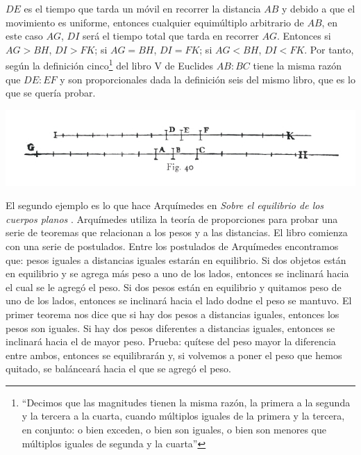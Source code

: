 $DE$ es el tiempo que tarda un móvil en recorrer la distancia $AB$ y debido a que el movimiento es uniforme, entonces cualquier equimúltiplo arbitrario de $AB$, en este caso $AG$, $DI$ será el tiempo total que tarda en recorrer $AG$. Entonces si $AG > BH$, $DI > FK$; si $AG = BH$, $DI = FK$; si $AG < BH$, $DI < FK$. Por tanto, según la definición cinco\footnote{``Decimos que las magnitudes tienen la misma razón, la primera a la segunda y  la tercera a la cuarta, cuando múltiplos iguales de la primera y la tercera, en conjunto: o bien exceden, o bien son iguales, o bien son menores que múltiplos iguales de segunda y la cuarta''} del libro V de Euclides \cite{Euclides1956} $AB:BC$ tiene la misma razón que $DE:EF$ y son proporcionales dada la definición seis del mismo libro, que es lo que se quería probar.

\includegraphics[width=\textwidth]{fig40.jpg}

El segundo ejemplo es lo que hace Arquímedes en \emph{Sobre el equilibrio de los cuerpos planos} \cite{Archimedes1897}. Arquímedes utiliza la teoría de proporciones para probar una serie de teoremas que relacionan a los pesos y a las distancias. El libro comienza con una serie de postulados. Entre los postulados de Arquímedes encontramos que: pesos iguales a distancias iguales estarán en equilibrio. Si dos objetos están en equilibrio y se agrega más peso a uno de los lados, entonces se inclinará hacia el cual se le agregó el peso. Si dos pesos están en equilibrio y quitamos peso de uno de los lados, entonces se inclinará hacia el lado dodne el peso se mantuvo. El primer teorema nos dice que si hay dos pesos a distancias iguales, entonces los pesos son iguales. Si hay dos pesos diferentes a distancias iguales, entonces se inclinará hacia el de mayor peso. Prueba: quítese del peso mayor la diferencia entre ambos, entonces se equilibrarán y, si volvemos a poner el peso que hemos quitado, se balánceará hacia el que se agregó el peso.

